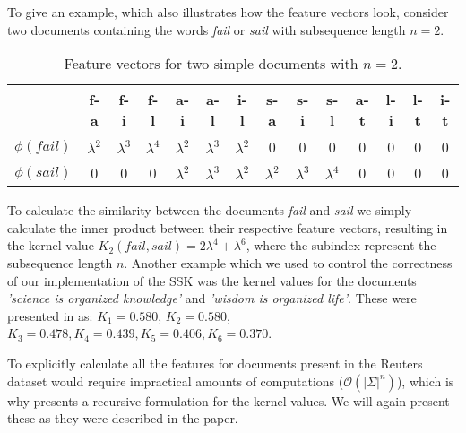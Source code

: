 To give an example, which also illustrates how the feature vectors look, consider two documents containing the words \textit{fail} or \textit{sail} with subsequence length $ n=2 $. \vspace{5pt}

\begin{table}[h]
	\centering
\begin{tabular}{|c|c|c|c|c|c|c|c|c|c|c|c|c|c|}
	\hline 
	& f-a & f-i & f-l & a-i & a-l & i-l & s-a & s-i & s-l & a-t & l-i & l-t & i-t \\ 
	\hline 
	$\phi(fail)$ & $ \lambda^2 $ & $ \lambda^3 $ &$ \lambda^4 $  &  $ \lambda^2 $& $ \lambda^3 $  & $ \lambda^2 $ & 0 & 0 & 0 & 0 & 0 & 0 & 0 \\ 
	\hline 
	$\phi(sail)$ & 0 & 0 & 0 & $\lambda^2$ & $\lambda^3$ & $\lambda^2$ & $\lambda^2$ & $\lambda^3$ & $\lambda^4$ & 0 & 0 & 0 & 0 \\ 
	\hline 
\end{tabular} 
\caption{Feature vectors for two simple documents with $ n=2 $.\label{tab:exempel}}
\end{table}

To calculate the similarity between the documents \textit{fail} and \textit{sail} we simply calculate the inner product between their respective feature vectors, resulting in the kernel value $ K_2(fail,sail)  = 2\lambda^4 + \lambda^6 $, where the subindex represent the subsequence length $ n $. Another example which we used to control the correctness of our implementation of the SSK was the kernel values for the documents \textit{'science is organized knowledge'} and \textit{'wisdom is organized life'}. These were presented in \cite{lodhi} as: $ K_1 = 0.580 $, $ K_2 = 0.580$, $ K_3 = 0.478, K_4=0.439, K_5 = 0.406, K_6 = 0.370 $.

To explicitly calculate all the features for documents present in the Reuters dataset would require impractical amounts of computations ($ \mathcal{O}(|\Sigma|^n) $), which is why \cite{lodhi} presents a recursive formulation for the kernel values. We will again present these as they were described in the paper.

